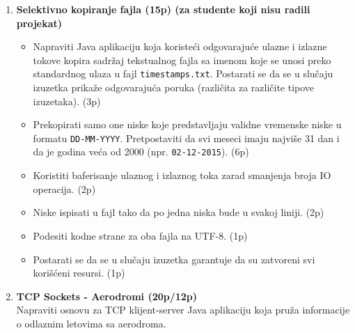 \documentclass[]{article}
\begin{document}
\begin{enumerate}

\item \textbf{Selektivno kopiranje fajla (15p) (za studente koji nisu radili projekat)}
  \begin{itemize}
    \item Napraviti Java aplikaciju koja koriste\'c{}i odgovaraju\'c{}e ulazne i izlazne tokove kopira sadr\v{z}aj tekstualnog fajla sa imenom koje se unosi preko standardnog ulaza u fajl \texttt{timestamps.txt}. Postarati se da se u slu\v{c}aju izuzetka prika\v{z}e odgovaraju\'c{}a poruka (razli\v{c}ita za razli\v{c}ite tipove izuzetaka). \hfill (3p)
    \item Prekopirati samo one niske koje predstavljaju validne vremenske niske u formatu \texttt{DD-MM-YYYY}. Pretpostaviti da svi meseci imaju najvi\v{s}e 31 dan i da je godina ve\'c{}a od 2000 (npr. \texttt{02-12-2015}). \hfill (6p)
    \item Koristiti baferisanje ulaznog i izlaznog toka zarad smanjenja broja IO operacija. \hfill (2p)
    \item Niske ispisati u fajl tako da po jedna niska bude u svakoj liniji. \hfill (2p)
    \item Podesiti kodne strane za oba fajla na UTF-8. \hfill (1p)
    \item Postarati se da se u slu\v{c}aju izuzetka garantuje da su zatvoreni svi kori\v{s}\'c{}eni resursi. \hfill (1p)
  \end{itemize}

\vspace{15pt}

\item \textbf{TCP Sockets - Aerodromi (20p/12p)}
\\Napraviti osnovu za TCP klijent-server Java aplikaciju koja pruža informacije o odlaznim letovima sa aerodroma. 


\end{enumerate}
\end{document}

